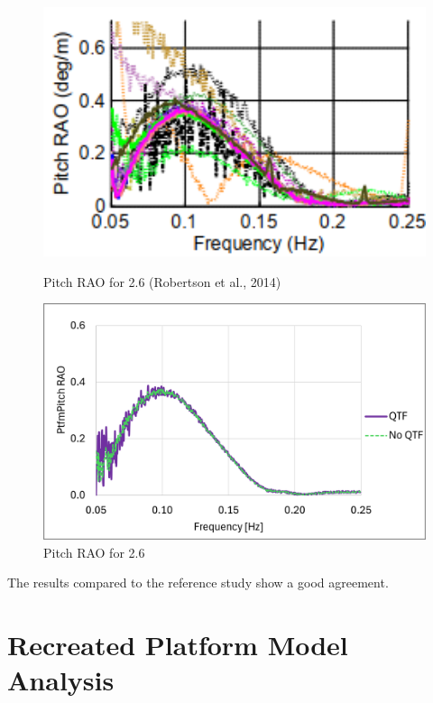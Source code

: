 \documentclass[a4paper, 11pt]{article}
\begin{document}
\begin{figure}[H]
    \begin{minipage}{0.48\textwidth}
        \centering
        \includegraphics[width=1\textwidth]{2.6_pitch.png}
        \caption{\small Pitch RAO for 2.6 (Robertson et al., 2014)}
        \label{fig:2.6_pitch}
    \end{minipage}
    \hfill
    \begin{minipage}{0.5\textwidth}
        \centering
        \vspace{-0.4cm}
        \includegraphics[width=1\textwidth]{2.6_pitch_mine.png}
        \caption{\small Pitch RAO for 2.6}
        \label{fig:2.6_pitch_mine}
    \end{minipage}
\end{figure}

The results compared to the reference study show a good agreement. 


\section{Recreated Platform Model Analysis}
\end{document}

